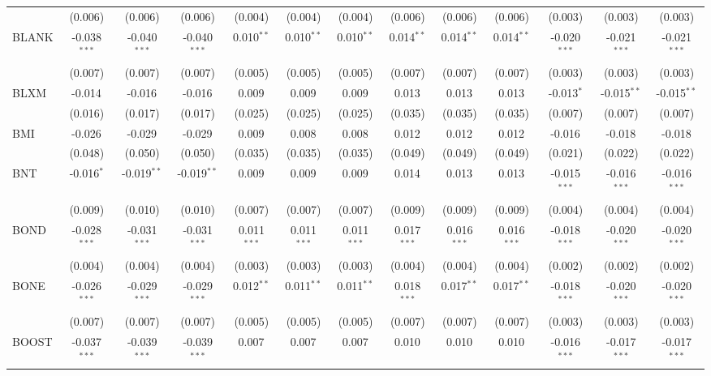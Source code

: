 \begin{table}[!htbp]
\begin{tabular}{@{\extracolsep{5pt}}lcccccccccccc}
  & (0.006) & (0.006) & (0.006) & (0.004) & (0.004) & (0.004) & (0.006) & (0.006) & (0.006) & (0.003) & (0.003) & (0.003) \\
 BLANK & -0.038$^{***}$ & -0.040$^{***}$ & -0.040$^{***}$ & 0.010$^{**}$ & 0.010$^{**}$ & 0.010$^{**}$ & 0.014$^{**}$ & 0.014$^{**}$ & 0.014$^{**}$ & -0.020$^{***}$ & -0.021$^{***}$ & -0.021$^{***}$ \\
  & (0.007) & (0.007) & (0.007) & (0.005) & (0.005) & (0.005) & (0.007) & (0.007) & (0.007) & (0.003) & (0.003) & (0.003) \\
 BLXM & -0.014$^{}$ & -0.016$^{}$ & -0.016$^{}$ & 0.009$^{}$ & 0.009$^{}$ & 0.009$^{}$ & 0.013$^{}$ & 0.013$^{}$ & 0.013$^{}$ & -0.013$^{*}$ & -0.015$^{**}$ & -0.015$^{**}$ \\
  & (0.016) & (0.017) & (0.017) & (0.025) & (0.025) & (0.025) & (0.035) & (0.035) & (0.035) & (0.007) & (0.007) & (0.007) \\
 BMI & -0.026$^{}$ & -0.029$^{}$ & -0.029$^{}$ & 0.009$^{}$ & 0.008$^{}$ & 0.008$^{}$ & 0.012$^{}$ & 0.012$^{}$ & 0.012$^{}$ & -0.016$^{}$ & -0.018$^{}$ & -0.018$^{}$ \\
  & (0.048) & (0.050) & (0.050) & (0.035) & (0.035) & (0.035) & (0.049) & (0.049) & (0.049) & (0.021) & (0.022) & (0.022) \\
 BNT & -0.016$^{*}$ & -0.019$^{**}$ & -0.019$^{**}$ & 0.009$^{}$ & 0.009$^{}$ & 0.009$^{}$ & 0.014$^{}$ & 0.013$^{}$ & 0.013$^{}$ & -0.015$^{***}$ & -0.016$^{***}$ & -0.016$^{***}$ \\
  & (0.009) & (0.010) & (0.010) & (0.007) & (0.007) & (0.007) & (0.009) & (0.009) & (0.009) & (0.004) & (0.004) & (0.004) \\
 BOND & -0.028$^{***}$ & -0.031$^{***}$ & -0.031$^{***}$ & 0.011$^{***}$ & 0.011$^{***}$ & 0.011$^{***}$ & 0.017$^{***}$ & 0.016$^{***}$ & 0.016$^{***}$ & -0.018$^{***}$ & -0.020$^{***}$ & -0.020$^{***}$ \\
  & (0.004) & (0.004) & (0.004) & (0.003) & (0.003) & (0.003) & (0.004) & (0.004) & (0.004) & (0.002) & (0.002) & (0.002) \\
 BONE & -0.026$^{***}$ & -0.029$^{***}$ & -0.029$^{***}$ & 0.012$^{**}$ & 0.011$^{**}$ & 0.011$^{**}$ & 0.018$^{***}$ & 0.017$^{**}$ & 0.017$^{**}$ & -0.018$^{***}$ & -0.020$^{***}$ & -0.020$^{***}$ \\
  & (0.007) & (0.007) & (0.007) & (0.005) & (0.005) & (0.005) & (0.007) & (0.007) & (0.007) & (0.003) & (0.003) & (0.003) \\
 BOOST & -0.037$^{***}$ & -0.039$^{***}$ & -0.039$^{***}$ & 0.007$^{}$ & 0.007$^{}$ & 0.007$^{}$ & 0.010$^{}$ & 0.010$^{}$ & 0.010$^{}$ & -0.016$^{***}$ & -0.017$^{***}$ & -0.017$^{***}$ \\

\end{tabular}
\end{table}
